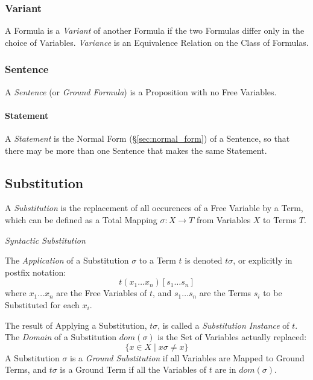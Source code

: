 \subsubsection{Variant}\label{sec:variant}

A Formula is a \emph{Variant} of another Formula if the two Formulas
differ only in the choice of Variables. \emph{Variance} is an
Equivalence Relation on the Class of Formulas.



\subsubsection{Sentence}\label{sec:sentence}

A \emph{Sentence} (or \emph{Ground Formula}) is a Proposition with no
Free Variables.



\paragraph{Statement}\label{sec:statement}\hfill

A \emph{Statement} is the Normal Form (\S\ref{sec:normal_form}) of a
Sentence, so that there may be more than one Sentence that makes the
same Statement.



\subsection{Substitution}\label{sec:substitution}

A \emph{Substitution} is the replacement of all occurences of a Free
Variable by a Term, which can be defined as a Total Mapping $\sigma: X
\rightarrow T$ from Variables $X$ to Terms $T$.

\emph{Syntactic Substitution}

The \emph{Application} of a Substitution $\sigma$ to a Term $t$ is
denoted $t\sigma$, or explicitly in postfix notation:
\[
  t(x_1 \ldots x_n)[s_1 \ldots s_n]
\]
where $x_1 \ldots x_n$ are the Free Variables of $t$, and $s_1 \ldots
s_n$ are the Terms $s_i$ to be Substituted for each $x_i$.

The result of Applying a Substitution, $t\sigma$, is called a
\emph{Substitution Instance} of $t$. The \emph{Domain} of a
Substitution $dom(\sigma)$ is the Set of Variables actually replaced:
\[
  \{ x \in X \;|\; x\sigma \neq x \}
\]
A Substitution $\sigma$ is a \emph{Ground Substitution} if all
Variables are Mapped to Ground Terms, and $t\sigma$ is a Ground Term
if all the Variables of $t$ are in $dom(\sigma)$.

